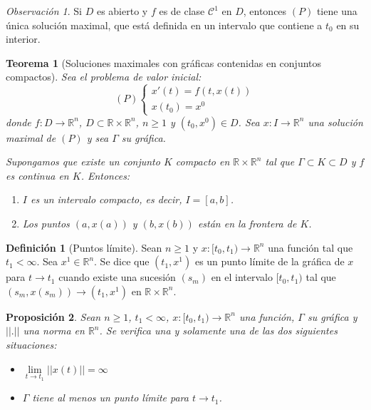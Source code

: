 \documentclass{report}
\newtheorem{theorem}{Teorema}[chapter]
\newtheorem{proposition}[theorem]{Proposición}
\theoremstyle{remark}
\newtheorem*{remark}{Observación}
\theoremstyle{remark}
\theoremstyle{remark}
\theoremstyle{definition}
\newtheorem{definition}{Definición}[chapter]
\theoremstyle{definition}
\theoremstyle{definition}
\begin{document}
\begin{remark}
    Si $D$ es abierto y $f$ es de clase $\mathcal{C}^1$ en $D$, entonces $(P)$ tiene una única solución maximal, que está definida en un intervalo que contiene a $t_0$ en su interior.
\end{remark}

\begin{theorem}[Soluciones maximales con gráficas contenidas en conjuntos compactos]
    Sea el problema de valor inicial:
    $$(P) \begin{cases}
            x'(t) = f(t, x(t)) \\
            x(t_0) = x^0
        \end{cases}$$
    donde $f: D \to \mathbb{R}^n$, $D \subset \mathbb{R} \times \mathbb{R}^n$, $n \geq 1$ y $(t_0, x^0) \in D$.
    Sea $x: I \to \mathbb{R}^n$ una solución maximal de $(P)$ y sea $\Gamma$ su gráfica.

    Supongamos que existe un conjunto $K$ compacto en $\mathbb{R} \times \mathbb{R}^n$ tal que $\Gamma \subset K \subset D$ y $f$ es continua en $K$.
    Entonces:
    \begin{enumerate}
        \item $I$ es un intervalo compacto, es decir, $I = [a, b]$.
        \item Los puntos $(a, x(a))$ y $(b, x(b))$ están en la frontera de $K$.
    \end{enumerate}
\end{theorem}

\begin{definition}[Puntos límite]
    Sean $n \geq 1$ y $x: [t_0, t_1) \to \mathbb{R}^n$ una función tal que $t_1 < \infty$.
    Sea $x^1 \in \mathbb{R}^n$.
    Se dice que $(t_1, x^1)$ es un punto límite de la gráfica de $x$ para $t \to t_1$ cuando existe una sucesión $(s_m)$ en el intervalo $[t_0, t_1)$ tal que $(s_m, x(s_m)) \to (t_1, x^1)$ en $\mathbb{R} \times \mathbb{R}^n$.
\end{definition}

\begin{proposition}
    Sean $n \geq 1$, $t_1 < \infty$, $x: [t_0, t_1) \to \mathbb{R}^n$ una función, $\Gamma$ su gráfica y $||.||$ una norma en $\mathbb{R}^n$.
    Se verifica una y solamente una de las dos siguientes situaciones:
    \begin{itemize}
        \item $\lim\limits_{t \to t_1} ||x(t)|| = \infty$
        \item $\Gamma$ tiene al menos un punto límite para $t \to t_1$.
    \end{itemize}
\end{proposition}
\end{document}
